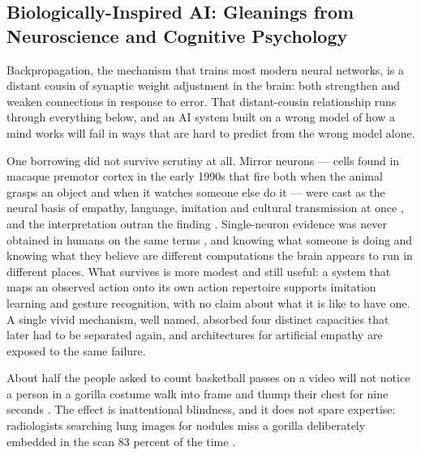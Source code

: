 \subsection{Biologically-Inspired AI: Gleanings from Neuroscience and Cognitive Psychology}
\label{sec:4.1.2}
Backpropagation, the mechanism that trains most modern neural networks, is a distant cousin of synaptic weight adjustment in the brain: both strengthen and weaken connections in response to error. That distant-cousin relationship runs through everything below, and an AI system built on a wrong model of how a mind works will fail in ways that are hard to predict from the wrong model alone.

One borrowing did not survive scrutiny at all. Mirror neurons — cells found in macaque premotor cortex in the early 1990s that fire both when the animal grasps an object and when it watches someone else do it \autocite{gallese1996action} — were cast as the neural basis of empathy, language, imitation and cultural transmission at once \autocite{ramachandran2009neurons}, and the interpretation outran the finding \autocite{hickok2014myth}. Single-neuron evidence was never obtained in humans on the same terms \autocite{mukamel2010singleneuron}, and knowing what someone is doing and knowing what they believe are different computations the brain appears to run in different places. What survives is more modest and still useful: a system that maps an observed action onto its own action repertoire supports imitation learning and gesture recognition, with no claim about what it is like to have one. A single vivid mechanism, well named, absorbed four distinct capacities that later had to be separated again, and architectures for artificial empathy are exposed to the same failure.

About half the people asked to count basketball passes on a video will not notice a person in a gorilla costume walk into frame and thump their chest for nine seconds \autocite{simons1999gorillas}. The effect is inattentional blindness, and it does not spare expertise: radiologists searching lung images for nodules miss a gorilla deliberately embedded in the scan 83 percent of the time \autocite{drew2013invisible}.

